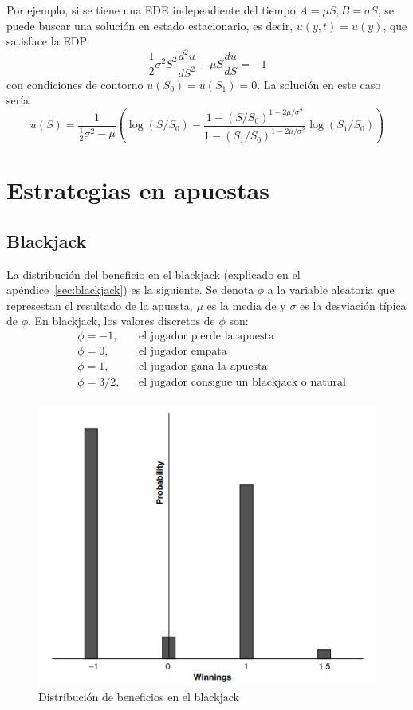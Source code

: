 Por ejemplo, si se tiene una EDE independiente del tiempo $A=\mu S, B=\sigma S$, se puede buscar una solución en estado estacionario, es decir, $u(y, t) = u(y)$, que satisface la EDP
\[
    \frac{1}{2}\sigma^2 S^2 \frac{d^2 u}{dS^2} + \mu S \frac{du}{dS} = -1
\]
con condiciones de contorno $u(S_0) = u(S_1) = 0$. La solución en este caso sería.
\[
    u(S) = \frac{1}{\frac{1}{2}\sigma^2 - \mu} \left( \log(S/S_0) - \frac{1 - (S/S_0)^{1-2\mu/\sigma^2}}{1 - (S_1/S_0)^{1-2\mu/\sigma^2}} \log(S_1/S_0) \right)
\]








\section{Estrategias en apuestas}

\subsection{Blackjack}
La distribución del beneficio en el blackjack (explicado en el apéndice~\ref{sec:blackjack}) es la siguiente. Se denota $\phi$ a la variable aleatoria que represestan el resultado de la apuesta, $\mu$ es la media de y $\sigma$ es la desviación típica de $\phi$. En blackjack, los valores discretos de $\phi$ son:
\begin{align*}
    &\phi = -1, && \text{el jugador pierde la apuesta} \\
    &\phi = 0, && \text{el jugador empata} \\
    &\phi = 1, && \text{el jugador gana la apuesta} \\
    &\phi = 3/2, && \text{el jugador consigue un blackjack o natural} \\
\end{align*}
\begin{figure}[H]
    \centering
    \includegraphics[width=0.65\linewidth]{Imagenes/3_Aleatoriedad/blackjack_Dist.png}
    \caption{Distribución de beneficios en el blackjack}
\end{figure}





